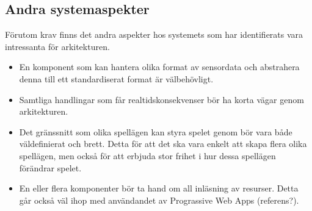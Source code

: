 \subsection{Andra systemaspekter}
Förutom krav finns det andra aspekter hos systemets som har identifierats vara intressanta för arkitekturen.

\begin{itemize}
    \item En komponent som kan hantera olika format av sensordata och abstrahera denna till ett standardiserat format är välbehövligt.
    \item Samtliga handlingar som får realtidskonsekvenser bör ha korta vägar genom arkitekturen.
    \item Det gränssnitt som olika spellägen kan styra spelet genom bör vara både väldefinierat och brett. Detta för att det ska vara enkelt att skapa flera olika spellägen, men också för att erbjuda stor frihet i hur dessa spellägen förändrar spelet.
    \item En eller flera komponenter bör ta hand om all inläsning av resurser. Detta går också väl ihop med användandet av Prograssive Web Apps (referens?).
\end{itemize}
